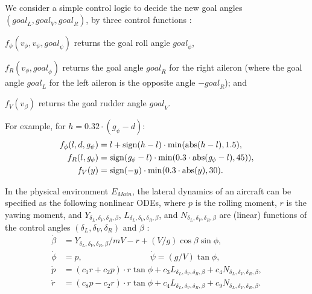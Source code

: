 We consider a simple control logic to decide 
the new goal angles $(\mathit{goal}_L,\mathit{goal}_V,\mathit{goal}_R)$,
by three control functions \cite{ftscs-journal}:
%
\begin{inparaenum}[(i)]
	\item $f_\phi(v_\phi, v_\psi, \mathit{goal}_\psi)$
		returns the goal roll angle $\mathit{goal}_\phi$,
	\item $f_{R}(v_\phi, \mathit{goal}_\phi)$ returns the goal angle $\mathit{goal}_R$ for the right aileron
	(where the goal angle $\mathit{goal}_L$ for the left aileron is the opposite angle $- \mathit{goal}_R$);
	and
	\item $f_V(v_\beta)$ returns the goal rudder angle $\mathit{goal}_V$.
\end{inparaenum}
For example, for $h = 0.32 \cdot (\mathit{g}_\psi - d)$:
\begin{align*}
f_\phi(l, d, \mathit{g}_\psi) &= 
l + \mathrm{sign}(h - l) \cdot \min(\mathrm{abs}(h - l),1.5),
\\
f_{R}(l, \mathit{g}_\phi) &=
\mathrm{sign}(\mathit{g}_\phi - l)\cdot \min(0.3 \cdot \mathrm{abs}(\mathit{g}_\phi - l), 45)),
\\
f_V(y) &=
\mathrm{sign}(-y)\cdot \min(0.3 \cdot \mathrm{abs}(y), 30).
\end{align*}

In the physical environment $E_\mathit{Main}$,
the lateral dynamics of an aircraft
can be specified as the following nonlinear ODEs,
where $p$ is the rolling moment, $r$ is the yawing moment,
and $Y_{\delta_L,\delta_V,\delta_R,\beta}$, $L_{\delta_L,\delta_V,\delta_R,\beta}$, and $N_{\delta_L,\delta_V,\delta_R,\beta}$
are (linear) functions of the control angles $(\delta_L,\delta_V,\delta_R)$ 
and $\beta$
\cite{stevens2003aircraft}:
%
\begin{align*}
\dot{\beta} &= Y_{\delta_L,\delta_V,\delta_R,\beta} / m V - r + (V / g) \cos \beta \sin \phi,
\\
\dot{\phi} &= p,
\qquad\qquad\qquad\qquad
\dot{\psi} = (g / V) \tan \phi,
\\
\dot{p} &= (c_1 r + c_2 p) \cdot r  \tan \phi + c_3 L_{\delta_L,\delta_V,\delta_R,\beta} + c_4 N_{\delta_L,\delta_V,\delta_R,\beta},
\\
\dot{r} &= (c_8 p - c_2 r)  \cdot r  \tan \phi + c_4 L_{\delta_L,\delta_V,\delta_R,\beta} + c_9 N_{\delta_L,\delta_V,\delta_R,\beta}.
\end{align*}
%


